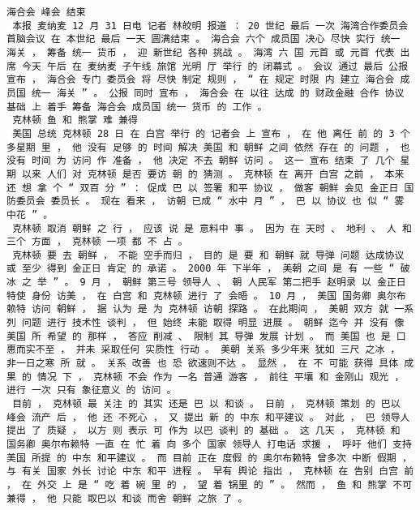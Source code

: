 \documentclass{article}
\begin{document}
\begin{Verbatim}[commandchars=\\\{\}]
 海合会 峰会 结束 
 本报 麦纳麦 12 月 31 日电 记者 林皎明 报道 ： 20 世纪 最后 一次 海湾合作委员会 首脑会议 在 本世纪 最后 一天 圆满结束 。 海合会 六个 成员国 决心 尽快 实行 统一 海关 ， 筹备 统一 货币 ， 迎 新世纪 各种 挑战 。 海湾 六 国 元首 或 元首 代表 出席 今天 午后 在 麦纳麦 子午线 旅馆 光明 厅 举行 的 闭幕式 。 会议 通过 最后 公报 宣布 ， 海合会 专门 委员会 将 尽快 制定 规则 ， “ 在 规定 时限 内 建立 海合会 成员国 统一 海关 ” 。 公报 同时 宣布 ， 海合会 在 以往 达成 的 财政金融 合作 协议 基础 上 着手 筹备 海合会 成员国 统一 货币 的 工作 。 
 克林顿 鱼 和 熊掌 难 兼得 
 美国 总统 克林顿 28 日 在 白宫 举行 的 记者会 上 宣布 ， 在 他 离任 前 的 3 个 多星期 里 ， 他 没有 足够 的 时间 解决 美国 和 朝鲜 之间 依然 存在 的 问题 ， 也 没有 时间 为 访问 作 准备 ， 他 决定 不去 朝鲜 访问 。 这一 宣布 结束 了 几个 星期 以来 人们 对 克林顿 是否 要访 朝 的 猜测 。 克林顿 在 离开 白宫 之前 ， 本来 还 想 拿 个 “ 双百 分 ” ： 促成 巴 以 签署 和平 协议 ， 做客 朝鲜 会见 金正日 国防委员会 委员长 。 现在 看来 ， 访朝 已成 “ 水中 月 ” ， 巴 以 协议 也 似 “ 雾 中花 ” 。 
 克林顿 取消 朝鲜 之 行 ， 应该 说 是 意料中 事 。 因为 在 天时 、 地利 、 人 和 三个 方面 ， 克林顿 一项 都 不 占 。 
 克林顿 要 去 朝鲜 ， 不能 空手而归 ， 目的 是 要 和 朝鲜 就 导弹 问题 达成协议 或 至少 得到 金正日 肯定 的 承诺 。 2000 年 下半年 ， 美朝 之间 是 有 一些 “ 破冰 之 举 ” 。 9 月 ， 朝鲜 第三号 领导人 、 朝 人民军 第二把手 赵明录 以 金正日 特使 身份 访美 ， 在 白宫 和 克林顿 进行 了 会晤 。 10 月 ， 美国 国务卿 奥尔布赖特 访问 朝鲜 ， 据 认为 是 为 克林顿 访朝 探路 。 在此期间 ， 美朝 双方 就 一系列 问题 进行 技术性 谈判 ， 但 始终 未能 取得 明显 进展 。 朝鲜 迄今 并 没有 像 美国 所 希望 的 那样 ， 答应 削减 、 限制 其 导弹 发展 计划 。 而 美国 也 是 口惠而实不至 ， 并未 采取任何 实质性 行动 。 美朝 关系 多少年来 犹如 三尺 之冰 ， 非一日之寒 所 就 。 关系 改善 也 恐 欲速则不达 。 显然 ， 在 不 可能 获得 具体 成果 的 情况 下 ， 克林顿 不会 作为 一名 普通 游客 ， 前往 平壤 和 金刚山 观光 ， 进行 一次 只有 象征意义 的 访问 。 
 目前 ， 克林顿 最 关注 的 其实 还是 巴 以 和谈 。 日前 ， 克林顿 策划 的 巴以 峰会 流产 后 ， 他 还 不死心 ， 又 提出 新 的 中东 和平建议 。 对此 ， 巴 领导人 提出 了 质疑 ， 以方 则 表示 可 作为 以巴 谈判 的 基础 。 这 几天 ， 克林顿 和 国务卿 奥尔布赖特 一直 在 忙 着 向 多个 国家 领导人 打电话 求援 ， 呼吁 他们 支持 美国 所提 的 中东 和平建议 。 而 目前 正在 度假 的 奥尔布赖特 曾多次 中断 假期 ， 与 有关 国家 外长 讨论 中东 和平 进程 。 早有 舆论 指出 ， 克林顿 在 告别 白宫 前 ， 在 外交 上 是 “ 吃 着 碗 里 的 ， 望 着 锅里 的 ” 。 然而 ， 鱼 和 熊掌 不可 兼得 ， 他 只能 取巴以 和谈 而舍 朝鲜 之旅 了 。 

\end{Verbatim}
\end{document}
